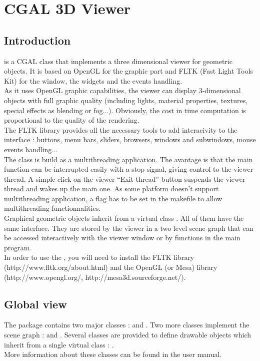 \chapter{CGAL 3D Viewer}

\section{Introduction}
 is a CGAL class that implements a three dimensional viewer for 
geometric objects. It is based on OpenGL for the graphic part and FLTK 
(Fast Light Tools Kit)
for the window, the widgets and the events handling. \\
As it uses OpenGL graphic capabilities, the viewer can display
3-dimensional objects with full graphic quality (including lights,
material properties, textures, special effects as blending
or fog...). Obviously, the cost in time computation is proportional
to the quality of the rendering.\\
The FLTK library provides all the necessary tools to add
interacivity to the interface : buttons, menu bars, sliders,
browsers, windows and subwindows, mouse events handling...\\
The class  is build as a multithreading application. The avantage is 
that the main function can be interrupted easily with a stop signal,
giving control to the viewer thread. A simple click on the viewer
``Exit thread'' button suspends the viewer thread and wakes up the main
one. As some platform doesn't support multithreading application, a
flag  has to be set in the makefile to allow
multithreading functionnalities.\\
Graphical geometric objects inherit from a virtual class 
. All of them have the same interface. They are stored by the
viewer in a two level scene graph that can be accessed interactively
with the viewer window or by functions in the main program. \\
In order to use the , you will need to install the FLTK
library (http://www.fltk.org/about.html) and the OpenGL (or Mesa)
library (http://www.opengl.org/, http://mesa3d.sourceforge.net/).

\section{Global view}

The package contains two major classes :  and 
. Two more classes implement the scene graph :  and . Several classes are provided to
define drawable objects which inherit from a single virtual class :
. 
\\
More information about these classes can be found in the user manual.


